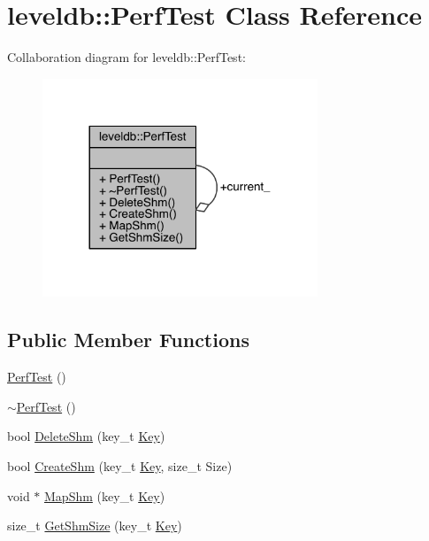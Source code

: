 \hypertarget{classleveldb_1_1_perf_test}{}\section{leveldb\+:\+:Perf\+Test Class Reference}
\label{classleveldb_1_1_perf_test}


Collaboration diagram for leveldb\+:\+:Perf\+Test\+:\nopagebreak
\begin{figure}[H]
\begin{center}
\leavevmode
\includegraphics[width=233pt]{classleveldb_1_1_perf_test__coll__graph}
\end{center}
\end{figure}
\subsection*{Public Member Functions}
\begin{DoxyCompactItemize}
\item 
\hyperlink{classleveldb_1_1_perf_test_acbe27b083fa2d0410d9ae2883a734f53}{Perf\+Test} ()
\item 
\hyperlink{classleveldb_1_1_perf_test_af2b9e39d62d47bff7507ea3b269872b3}{$\sim$\+Perf\+Test} ()
\item 
bool \hyperlink{classleveldb_1_1_perf_test_a28525fe47d678b2b270b75714ee84050}{Delete\+Shm} (key\+\_\+t \hyperlink{namespaceleveldb_a7e9a9725b13fa0bd922d885280dfab95}{Key})
\item 
bool \hyperlink{classleveldb_1_1_perf_test_ae1beacd6b29b154af85245162637662e}{Create\+Shm} (key\+\_\+t \hyperlink{namespaceleveldb_a7e9a9725b13fa0bd922d885280dfab95}{Key}, size\+\_\+t Size)
\item 
void $\ast$ \hyperlink{classleveldb_1_1_perf_test_aa5f506e4fcf9f017960e51995f951182}{Map\+Shm} (key\+\_\+t \hyperlink{namespaceleveldb_a7e9a9725b13fa0bd922d885280dfab95}{Key})
\item 
size\+\_\+t \hyperlink{classleveldb_1_1_perf_test_af7e07bff2ec070c73d79fefd19118c6e}{Get\+Shm\+Size} (key\+\_\+t \hyperlink{namespaceleveldb_a7e9a9725b13fa0bd922d885280dfab95}{Key})
\end{DoxyCompactItemize}
